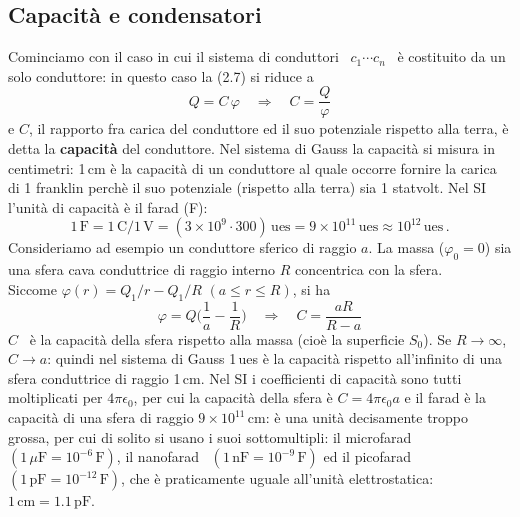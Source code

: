 \subsection{Capacit\`a e condensatori}

Cominciamo con il caso in cui il sistema di conduttori \ $c_1\cdots c_n$ \ \`e
costituito da un solo conduttore: in questo caso la (2.7) si riduce a
\begin{equation}
  Q=C\,\varphi\quad\Rightarrow\quad C=\frac Q\varphi
  \tag{2.17}
\end{equation}
e $C$, il rapporto fra carica del conduttore ed il suo potenziale rispetto alla
terra, \`e detta la \textbf{capacit\`a} del conduttore. Nel sistema di Gauss la
capacit\`a si misura in centimetri: 1\,cm \`e la capacit\`a di un conduttore al
quale occorre fornire la carica di 1 franklin perch\`e il suo potenziale
(rispetto alla terra) sia 1 statvolt. Nel SI l'unit\`a di capacit\`a \`e il
farad (F):
\begin{equation}
  1\,\mathrm F=1\,\mathrm C/1\,\mathrm V=(3\times10^9\cdot300)\,\mathrm{ues}
  =9\times10^{11}\,\mathrm{ues}\approx10^{12}\,\mathrm{ues}\,.
  \tag{2.18}
\end{equation}
Consideriamo ad esempio un conduttore sferico di raggio $a$. La massa
($\varphi_0=0$) sia una sfera cava conduttrice di raggio interno $R$ concentrica
con la sfera.\\
Siccome $\varphi(r)=Q_1/r-Q_1/R$ \quad $(a\le r\le R)$, si ha
\begin{equation}
  \varphi=Q\Big(\frac1a-\frac1R\Big)\quad\Rightarrow\quad C=\frac{aR}{R-a}
  \tag{2.19}
\end{equation}
$C$ \ \`e la capacit\`a della sfera rispetto alla massa (cio\`e la superficie
$S_0$). Se $R\to\infty$, $C\to a$: quindi nel sistema di Gauss 1\,ues \`e la
capacit\`a rispetto all'infinito di una sfera conduttrice di raggio 1\,cm. Nel
SI i coefficienti di capacit\`a sono tutti moltiplicati per $4\pi\epsilon_0$,
per cui la capacit\`a della sfera \`e $C=4\pi\epsilon_0a$ e il farad \`e la
capacit\`a di una sfera di raggio $9\times10^{11}$\,cm: \`e una unit\`a
decisamente troppo grossa, per cui di solito si usano i suoi sottomultipli: il
microfarad \ $(1\,\mu\mathrm F=10^{-6}\,\mathrm F)$, il nanofarad
\ $(1\,\mathrm{nF}=10^{-9}\,\mathrm F)$ ed il picofarad
\ $(1\,\mathrm{pF}=10^{-12}\,\mathrm F)$, che \`e praticamente uguale
all'unit\`a elettrostatica: $1\,\mathrm{cm}=1.1\,\mathrm{pF}$.

